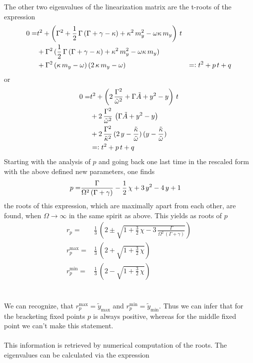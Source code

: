 \documentclass{article}
\begin{document}
The other two eigenvalues of the linearization matrix are the t-roots of the expression
\begin{align*}
    0=&t^2+\left( \Gamma^2 +\frac{1}{2}\,\Gamma\,(\Gamma+\gamma-\kappa)+\kappa^2\,m_y^2
    -\omega\kappa\,m_y\right)\,t\\
    &+\Gamma^2\,(\frac{1}{2}\,\Gamma\,(\Gamma+\gamma-\kappa)+\kappa^2\,m_y^2-\omega\kappa\,m_y)\\
    &+\Gamma^2\,(\kappa\,m_y-\omega)\,(2\,\kappa\,m_y-\omega)
    &=\vcentcolon t^2+p\,t+q
\end{align*}
or
\begin{align*}
    0=&t^2+\left( 2\,\frac{\Gamma^2}{\tilde{\omega}^2}+\Gamma\tilde{A}+y^2-y \right)\,t\\
    &+2\,\frac{\Gamma^2}{\tilde{\omega}^2}\,\left( \Gamma\tilde{A}+y^2-y \right)\\
    &+2\,\frac{\Gamma^2}{\tilde{\kappa}^2}\,(2\,y-\frac{\tilde{\kappa}}{\tilde{\omega}})\,(y-\frac{\tilde{\kappa}}{\tilde{\omega}})\\
    &=\vcentcolon t^2+p\,t+q
\end{align*}
Starting with the analysis of $p$ and going back one last time in the rescaled form with the above defined new parameters, one finds
\begin{align*}
    p=&\frac{\Gamma}{\Omega^2\,(\Gamma+\gamma)}-\frac{1}{2}\,\chi+3\,y^2-4\,y+1
\end{align*}
the roots of this expression, which are maximally apart from each other, are found, when $\Omega\rightarrow\infty$ in the same spirit as above. This yields as roots of $p$
\begin{align*}
    r_p=&\frac{1}{3}\,\left( 2\pm\sqrt{1+\frac{3}{2}\,\chi-3\,\frac{\Gamma}{\Omega^2\,(\Gamma+\gamma)}} \right)\\
    r_p^\text{max}=&\frac{1}{3}\,\left( 2+\sqrt{1+\frac{3}{2}\,\chi} \right)\\
    r_p^\text{min}=&\frac{1}{3}\,\left( 2-\sqrt{1+\frac{3}{2}\,\chi} \right)
\end{align*}\\\\
We can recognize, that $r_p^\text{max}=\tilde{y}_\text{max}$ and $r_p^\text{min}=\tilde{y}_\text{min}$. Thus we can infer that for the bracketing fixed points $p$ is always positive, whereas for the middle fixed point we can't make this statement.\\\\
This information is retrieved by numerical computation of the roots. The eigenvalues can be calculated via the expression
\end{document}
